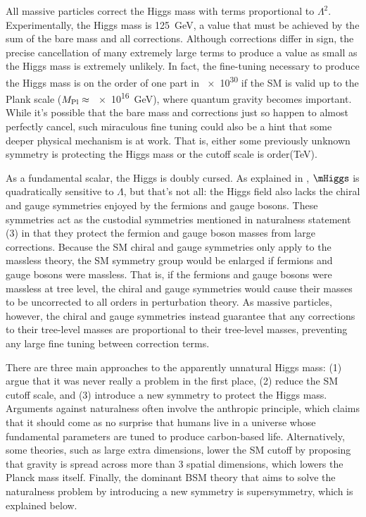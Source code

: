 \documentclass[12pt]{article}
\begin{document}
    All massive particles correct the Higgs mass with terms proportional to $\Lambda^2$. Experimentally, the Higgs mass is \SI{125}{GeV}, a value that must be achieved by the sum of the bare mass and all corrections. Although corrections differ in sign, the precise cancellation of many extremely large terms to produce a value as small as the Higgs mass is extremely unlikely. In fact, the fine-tuning necessary to produce the Higgs mass is on the order of one part in \num{e30} if the SM is valid up to the Plank scale ($M_{\mathrm{Pl}}\approx$ \SI{e16}{GeV}), where quantum gravity becomes important. While it's possible that the bare mass and corrections just so happen to almost perfectly cancel, such miraculous fine tuning could also be a hint that some deeper physical mechanism is at work. That is, either some previously unknown symmetry is protecting the Higgs mass or the cutoff scale is order(TeV).
    
    As a fundamental scalar, the Higgs is doubly cursed. As explained in , $\mHiggs$ is quadratically sensitive to $\Lambda$, but that's not all: the Higgs field also lacks the chiral and gauge symmetries enjoyed by the fermions and gauge bosons. These symmetries act as the custodial symmetries mentioned in naturalness statement (3) in that they protect the fermion and gauge boson masses from large corrections. Because the SM chiral and gauge symmetries only apply to the massless theory, the SM symmetry group would be enlarged if fermions and gauge bosons were massless. That is, if the fermions and gauge bosons were massless at tree level, the chiral and gauge symmetries would cause their masses to be uncorrected to all orders in perturbation theory. As massive particles, however, the chiral and gauge symmetries instead guarantee that any corrections to their tree-level masses are proportional to their tree-level masses, preventing any large fine tuning between correction terms. 

     There are three main approaches to the apparently unnatural Higgs mass: (1) argue that it was never really a problem in the first place, (2) reduce the SM cutoff scale, and (3) introduce a new symmetry to protect the Higgs mass. Arguments against naturalness often involve the anthropic principle, which claims that it should come as no surprise that humans live in a universe whose fundamental parameters are tuned to produce carbon-based life. Alternatively, some theories, such as large extra dimensions, lower the SM cutoff by proposing that gravity is spread across more than 3 spatial dimensions, which lowers the Planck mass itself. Finally, the dominant BSM theory that aims to solve the naturalness problem by introducing a new symmetry is supersymmetry, which is explained below.
    
\end{document}
